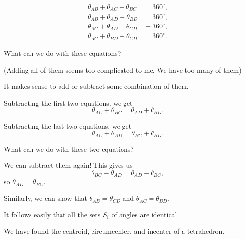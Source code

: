 \begin{align*}  
\theta_{AB} + \theta_{AC} + \theta_{BC} &= 360^\circ, \\  
\theta_{AB} + \theta_{AD} + \theta_{BD} &= 360^\circ, \\  
\theta_{AC} + \theta_{AD} + \theta_{CD} &= 360^\circ, \\  
\theta_{BC} + \theta_{BD} + \theta_{CD} &= 360^\circ.  
\end{align*}

What can we do with these equations?

(Adding all of them seems too complicated to me. We have too many of them)

It makes sense to add or subtract some combination of them.

Subtracting the first two equations, we get
$$\theta_{AC} + \theta_{BC} = \theta_{AD} + \theta_{BD}.$$

Subtracting the last two equations, we get
$$\theta_{AC} + \theta_{AD} = \theta_{BC} + \theta_{BD}.$$

What can we do with these two equations?





We can subtract them again! This gives us
$$\theta_{BC} - \theta_{AD} = \theta_{AD} - \theta_{BC},$$
so $\theta_{AD} = \theta_{BC}$.

Similarly, we can show that $\theta_{AB} = \theta_{CD}$ and $\theta_{AC} = \theta_{BD}$.

It follows easily that all the sets $S_i$ of angles are identical.

We have found the centroid, circumcenter, and incenter of a tetrahedron.

